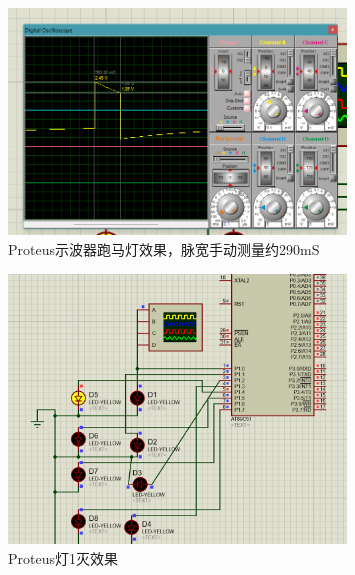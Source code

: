 \documentclass[12pt,hyperref,a4paper,UTF8]{ctexart}
\begin{document}
\begin{figure}[H] %
    \centering
    \includegraphics[width=0.8\textwidth]{figures/201.png} %
    \caption{Proteus示波器跑马灯效果，脉宽手动测量约290mS} %
    \label{fig:example} %
\end{figure}

\begin{figure}[H] %
    \centering
    \includegraphics[width=0.8\textwidth]{figures/202.png} %
    \caption{Proteus灯1灭效果} %
    \label{fig:example} %
\end{figure}
\end{document}
